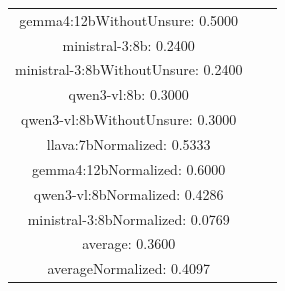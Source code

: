 \documentclass[a4paper]{article}
\begin{document}
\begin{tabular}{ccc}
gemma4:12bWithoutUnsure: 0.5000 \\ ministral-3:8b: 0.2400 \\ ministral-3:8bWithoutUnsure: 0.2400 \\ qwen3-vl:8b: 0.3000 \\ qwen3-vl:8bWithoutUnsure: 0.3000 \\ llava:7bNormalized: 0.5333 \\ gemma4:12bNormalized: 0.6000 \\ qwen3-vl:8bNormalized: 0.4286 \\ ministral-3:8bNormalized: 0.0769 \\ average: 0.3600 \\ averageNormalized: 0.4097 \end{minipage}\\
\end{tabular}

\vspace{5mm}
\end{document}
